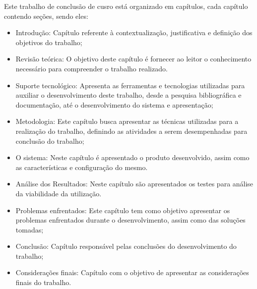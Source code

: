 Este trabalho de conclusão de cusro está organizado em capítulos, cada capítulo contendo
seções, sendo eles:
\begin{itemize}
  \item Introdução: Capítulo referente à contextualização, justificativa e definição dos objetivos do trabalho;

			\item Revisão teórica: O objetivo deste capítulo é fornecer ao leitor o conhecimento necessário para compreender o trabalho realizado.

			\item Suporte tecnológico: Apresenta as ferramentas e tecnologias utilizadas para auxiliar o desenvolvimento deste trabalho,
       desde a pesquisa bibliográfica e documentação, até o desenvolvimento do sistema e apresentação;

			\item Metodologia: Este capítulo busca apresentar as técnicas utilizadas para a realização do trabalho,
       definindo as atividades a serem desempenhadas para conclusão do trabalho;

      \item O sistema: Neste capítulo é apresentado o produto desenvolvido,
       assim como as características e configuração do mesmo.

			\item Análise dos Resultados: Neste capítulo são apresentados os testes para análise
da viabilidade da utilização.

      \item Problemas enfrentados: Este capítulo tem como objetivo apresentar os problemas enfrentados durante o desenvolvimento,
       assim como das soluções tomadas;

      \item Conclusão: Capítulo responsável pelas conclusões do desenvolvimento do trabalho;

			\item Considerações finais: Capítulo com o objetivo de apresentar as considerações finais do trabalho.
    \end{itemize}
